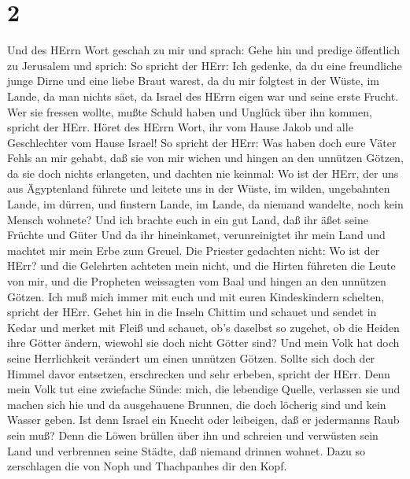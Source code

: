 \hypertarget{section-1}{%
\section{2}\label{section-1}}

 Und des HErrn Wort geschah zu mir und sprach: 
Gehe hin und predige öffentlich zu Jerusalem und sprich: So spricht der
HErr: Ich gedenke, da du eine freundliche junge Dirne und eine liebe
Braut warest, da du mir folgtest in der Wüste, im Lande, da man nichts
säet,  da Israel des HErrn eigen war und seine erste Frucht.
Wer sie fressen wollte, mußte Schuld haben und Unglück über ihn kommen,
spricht der HErr.  Höret des HErrn Wort, ihr vom Hause Jakob
und alle Geschlechter vom Hause Israel!  So spricht der
HErr: Was haben doch eure Väter Fehls an mir gehabt, daß sie von mir
wichen und hingen an den unnützen Götzen, da sie doch nichts erlangeten,
 und dachten nie keinmal: Wo ist der HErr, der uns aus
Ägyptenland führete und leitete uns in der Wüste, im wilden, ungebahnten
Lande, im dürren, und finstern Lande, im Lande, da niemand wandelte,
noch kein Mensch wohnete?  Und ich brachte euch in ein gut
Land, daß ihr äßet seine Früchte und Güter Und da ihr hineinkamet,
verunreinigtet ihr mein Land und machtet mir mein Erbe zum Greuel.
 Die Priester gedachten nicht: Wo ist der HErr? und die
Gelehrten achteten mein nicht, und die Hirten führeten die Leute von
mir, und die Propheten weissagten vom Baal und hingen an den unnützen
Götzen.  Ich muß mich immer mit euch und mit euren
Kindeskindern schelten, spricht der HErr.  Gehet hin in die
Inseln Chittim und schauet und sendet in Kedar und merket mit Fleiß und
schauet, ob's daselbst so zugehet,  ob die Heiden ihre
Götter ändern, wiewohl sie doch nicht Götter sind? Und mein Volk hat
doch seine Herrlichkeit verändert um einen unnützen Götzen.
 Sollte sich doch der Himmel davor entsetzen, erschrecken
und sehr erbeben, spricht der HErr.  Denn mein Volk tut
eine zwiefache Sünde: mich, die lebendige Quelle, verlassen sie und
machen sich hie und da ausgehauene Brunnen, die doch löcherig sind und
kein Wasser geben.  Ist denn Israel ein Knecht oder
leibeigen, daß er jedermanns Raub sein muß?  Denn die Löwen
brüllen über ihn und schreien und verwüsten sein Land und verbrennen
seine Städte, daß niemand drinnen wohnet.  Dazu so
zerschlagen die von Noph und Thachpanhes dir den Kopf. 
